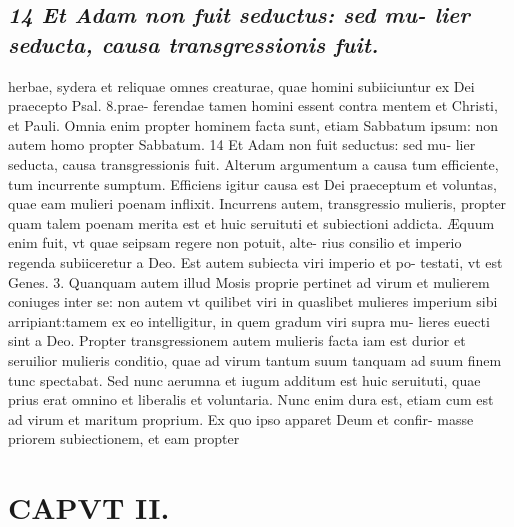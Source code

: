 \documentclass{article}
\begin{document}
\begin{pages}
\subsection*{\textit{14 Et Adam non fuit seductus: sed mu- lier seducta, causa transgressionis fuit.}}herbae, sydera et reliquae omnes creaturae, quae homini subiiciuntur ex Dei praecepto Psal. 8.prae- ferendae tamen homini essent contra mentem et Christi, et Pauli. Omnia enim propter hominem facta sunt, etiam Sabbatum ipsum: non autem homo propter Sabbatum. 14 Et Adam non fuit seductus: sed mu- lier seducta, causa transgressionis fuit. Alterum argumentum a causa tum efficiente, tum incurrente sumptum. Efficiens igitur causa est Dei praeceptum et voluntas, quae eam mulieri poenam inflixit. Incurrens autem, transgressio mulieris, propter quam talem poenam merita est et huic seruituti et subiectioni addicta. Æquum enim fuit, vt quae seipsam regere non potuit, alte- rius consilio et imperio regenda subiiceretur a Deo. Est autem subiecta viri imperio et po- testati, vt est Genes. 3. Quanquam autem illud Mosis proprie pertinet ad virum et mulierem coniuges inter se: non autem vt quilibet viri in quaslibet mulieres imperium sibi arripiant:tamem ex eo intelligitur, in quem gradum viri supra mu- lieres euecti sint a Deo. Propter transgressionem autem mulieris facta iam est durior et seruilior mulieris conditio, quae ad virum tantum suum tanquam ad suum finem tunc spectabat. Sed nunc aerumna et iugum additum est huic seruituti, quae prius erat omnino et liberalis et voluntaria. Nunc enim dura est, etiam cum est ad virum et maritum proprium. Ex quo ipso apparet Deum et confir- masse priorem subiectionem, et eam propter  \pend
\section*{CAPVT  II. }
\marginpar{[ p.89 ]}\pstart {}
{}

\end{pages}
\end{document}
